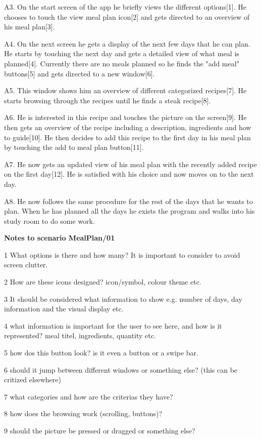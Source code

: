 	A3. On the start screen of the app he briefly views the different options[1]. He chooses to touch the view meal plan icon[2] and gets directed to an overview of his meal plan[3]. 
	
	A4. On the next screen he gets a display of the next few days that he can plan. He starts by touching the next day and gets a detailed view of what meal is planned[4]. Currently there are no meals planned so he finds the "add meal" buttons[5] and gets directed to a new window[6]. 
	
	A5. This window shows him an overview of different categorized recipes[7]. He starts browsing through the recipes until he finds a steak recipe[8]. 
	
	A6. He is interested in this recipe and touches the picture on the screen[9]. He then gets an overview of the recipe including a description, ingredients and how to guide[10]. He then decides to add this recipe to the first day in his meal plan by touching the add to meal plan button[11].
	
	A7. He now gets an updated view of his meal plan with the recently added recipe on the first day[12]. He is satisfied with his choice and now moves on to the next day. 
	
	A8. He now follows the same procedure for the rest of the days that he wants to plan. When he has planned all the days he exists the program and walks into his study room to do some work.
	
\textbf{Notes to scenario MealPlan/01}

1 What options is there and how many? It is important to consider to avoid screen clutter.

2 How are these icons designed? icon/symbol, colour theme etc.

3 It should be considered what information to show e.g. number of days, day information and the visual display etc.

4 what information is important for the user to see here, and how is it represented? meal titel, ingredients, quantity etc.

5 how dos this button look? is it even a button or a swipe bar.

6 should it jump between different windows or something else? (this can be critized elsewhere)

7 what categories and how are the criterias they have?

8 how does the browsing work (scrolling, buttons)?

9 should the picture be pressed or dragged or something else?

